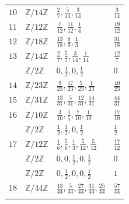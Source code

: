 \documentclass[10pt]{article}
\begin{document}
\begin{longtable}{llll}
\vspace{1mm}$10$ & $ \mathbb{Z}/14\mathbb{Z}$ &  $\frac{2}{7},\frac{5}{14},\frac{3}{14}$ & $ \frac{3}{14}$ \vspace{1mm}\\
\vspace{1mm}$11$ & $ \mathbb{Z}/12\mathbb{Z}$ & $\frac{7}{12},\frac{11}{12},\frac{1}{4} $ & $\frac{19}{12}$ \vspace{1mm}\\
\vspace{1mm}$12$ & $ \mathbb{Z}/18\mathbb{Z}$ &  $\frac{13}{18},\frac{8}{9},\frac{1}{3} $ & $\frac{31}{18}$ \vspace{1mm}\\
\vspace{1mm}$13$ & $ \mathbb{Z}/14\mathbb{Z}$ & $\frac{2}{7},\frac{5}{7},\frac{3}{14},\frac{1}{14}$  & $\frac{12}{7}$ \vspace{1mm}\\
\vspace{1mm}  & $ \mathbb{Z}/2\mathbb{Z}$ &  $0,\frac{1}{2},0,\frac{1}{2}$  & $0$ \vspace{1mm}\\
\vspace{1mm}$14$ &$ \mathbb{Z}/23\mathbb{Z}$ &  $\frac{9}{23},\frac{17}{23},\frac{5}{23},\frac{1}{23}$ & $\frac{40}{23}$  \vspace{1mm}\\
\vspace{1mm}$15$ & $ \mathbb{Z}/31\mathbb{Z}$ & $  \frac{13}{31},\frac{5}{31},\frac{12}{31},\frac{14}{31} $ & $\frac{44}{31}$ \vspace{1mm}\\
 \vspace{1mm}$16$ &  $ \mathbb{Z}/10\mathbb{Z}$ & $\frac{3}{10},\frac{1}{5},\frac{7}{10},\frac{1}{10} $  & $\frac{17}{10}$ \vspace{1mm}\\
 \vspace{1mm} & $ \mathbb{Z}/2\mathbb{Z}$ &  $\frac{1}{2},\frac{1}{2},0,\frac{1}{2} $ & $\frac{1}{2}$\\
  \vspace{1mm}$17$ & $ \mathbb{Z}/12\mathbb{Z}$ & $\frac{1}{6},\frac{5}{6},\frac{1}{3},\frac{5}{12},\frac{5}{12} $  & $\frac{17}{12}$ \vspace{1mm}\\
   \vspace{1mm} & $ \mathbb{Z}/2\mathbb{Z}$ & $0,0,\frac{1}{2},0,\frac{1}{2} $  & $0$ \vspace{1mm}\\
 \vspace{1mm}  &$ \mathbb{Z}/2\mathbb{Z}$ & $0,\frac{1}{2},0,0,\frac{1}{2}$  & $1$ \vspace{1mm}\\
  $18$ &$ \mathbb{Z}/44\mathbb{Z}$ & $\frac{13}{44},\frac{5}{44},\frac{27}{44},\frac{31}{44},\frac{25}{44}$ & $\frac{57}{44}$ \vspace{1mm} \\
\hline\\
\end{longtable} 
\end{document}
